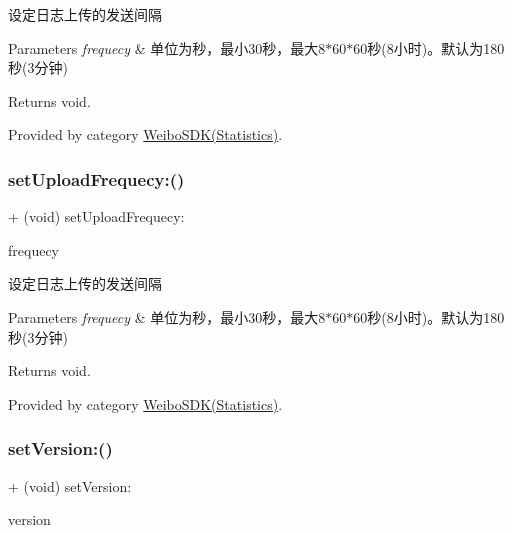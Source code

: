 设定日志上传的发送间隔 
\begin{DoxyParams}{Parameters}
{\em frequecy} & 单位为秒，最小30秒，最大8$\ast$60$\ast$60秒(8小时)。默认为180秒(3分钟) \\
\hline
\end{DoxyParams}
\begin{DoxyReturn}{Returns}
void. 
\end{DoxyReturn}


Provided by category \mbox{\hyperlink{category_weibo_s_d_k_07_statistics_08_a6790cf45454697f2b846eb080a130ef2}{Weibo\+S\+D\+K(\+Statistics)}}.

\mbox{\label{interface_weibo_s_d_k_a6790cf45454697f2b846eb080a130ef2}} 
\subsubsection{\texorpdfstring{set\+Upload\+Frequecy\+:()}{setUploadFrequecy:()}\hspace{0.1cm}{\footnotesize\ttfamily [3/3]}}
{\footnotesize\ttfamily + (void) set\+Upload\+Frequecy\+: \begin{DoxyParamCaption}\item[{(N\+S\+Time\+Interval)}]{frequecy }\end{DoxyParamCaption}}

设定日志上传的发送间隔 
\begin{DoxyParams}{Parameters}
{\em frequecy} & 单位为秒，最小30秒，最大8$\ast$60$\ast$60秒(8小时)。默认为180秒(3分钟) \\
\hline
\end{DoxyParams}
\begin{DoxyReturn}{Returns}
void. 
\end{DoxyReturn}


Provided by category \mbox{\hyperlink{category_weibo_s_d_k_07_statistics_08_a6790cf45454697f2b846eb080a130ef2}{Weibo\+S\+D\+K(\+Statistics)}}.

\mbox{\label{interface_weibo_s_d_k_ac68e6c65a10fa6c5f04c1293050a7127}} 
\subsubsection{\texorpdfstring{set\+Version\+:()}{setVersion:()}\hspace{0.1cm}{\footnotesize\ttfamily [1/3]}}
{\footnotesize\ttfamily + (void) set\+Version\+: \begin{DoxyParamCaption}\item[{(N\+S\+String $\ast$)}]{version }\end{DoxyParamCaption}}

